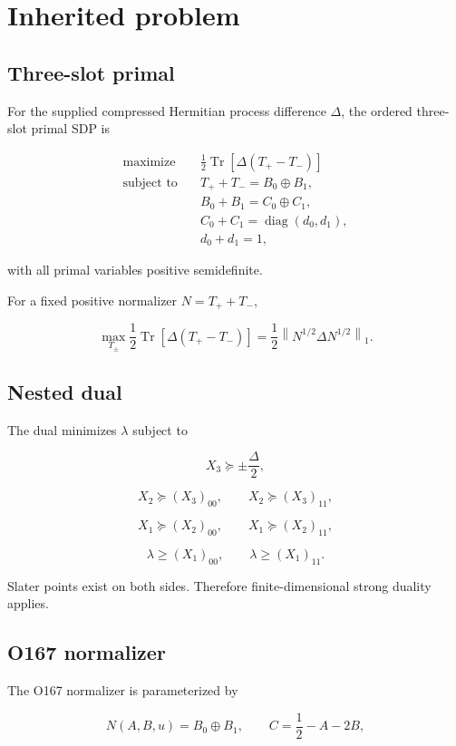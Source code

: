 \documentclass[11pt,a4paper,openany]{report}
\begin{document}
\chapter{Inherited problem}

\section{Three-slot primal}

For the supplied compressed Hermitian process difference \(\Delta\), the ordered three-slot primal SDP is

\[
\begin{aligned}
\operatorname{maximize}\quad&
\frac12\operatorname{Tr}[\Delta(T_+-T_-)]\\
\operatorname{subject\ to}\quad&
T_++T_-=B_0\oplus B_1,\\
&B_0+B_1=C_0\oplus C_1,\\
&C_0+C_1=\operatorname{diag}(d_0,d_1),\\
&d_0+d_1=1,
\end{aligned}
\]

with all primal variables positive semidefinite.

For a fixed positive normalizer \(N=T_++T_-\),

\[
\max_{T_\pm}
\frac12\operatorname{Tr}[\Delta(T_+-T_-)]
=\frac12\left\|N^{1/2}\Delta N^{1/2}\right\|_1.
\]

\section{Nested dual}

The dual minimizes \(\lambda\) subject to

\[
X_3\succeq\pm\frac{\Delta}{2},
\]

\[
X_2\succeq(X_3)_{00},\qquad
X_2\succeq(X_3)_{11},
\]

\[
X_1\succeq(X_2)_{00},\qquad
X_1\succeq(X_2)_{11},
\]

\[
\lambda\ge(X_1)_{00},\qquad
\lambda\ge(X_1)_{11}.
\]

Slater points exist on both sides. Therefore finite-dimensional strong duality applies.

\section{O167 normalizer}

The O167 normalizer is parameterized by

\[
N(A,B,u)=B_0\oplus B_1,
\qquad
C=\frac12-A-2B,
\]
\end{document}
